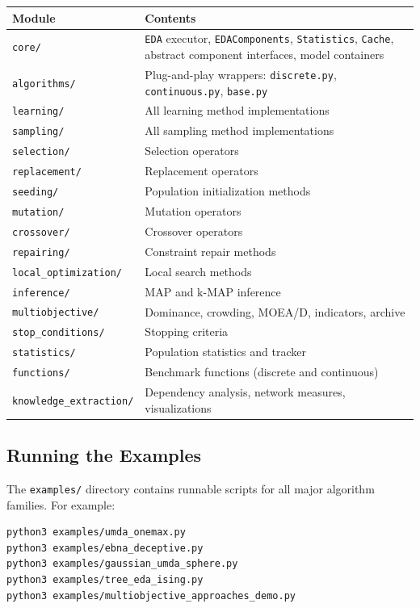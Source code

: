 \documentclass[a4paper,11pt]{article}
\begin{document}
\begin{center}
\begin{tabular}{lp{9cm}}
\toprule
\textbf{Module} & \textbf{Contents} \\
\midrule
\texttt{core/} & \texttt{EDA} executor, \texttt{EDAComponents}, \texttt{Statistics}, \texttt{Cache}, abstract component interfaces, model containers \\
\texttt{algorithms/} & Plug-and-play wrappers: \texttt{discrete.py}, \texttt{continuous.py}, \texttt{base.py} \\
\texttt{learning/} & All learning method implementations \\
\texttt{sampling/} & All sampling method implementations \\
\texttt{selection/} & Selection operators \\
\texttt{replacement/} & Replacement operators \\
\texttt{seeding/} & Population initialization methods \\
\texttt{mutation/} & Mutation operators \\
\texttt{crossover/} & Crossover operators \\
\texttt{repairing/} & Constraint repair methods \\
\texttt{local\_optimization/} & Local search methods \\
\texttt{inference/} & MAP and k-MAP inference \\
\texttt{multiobjective/} & Dominance, crowding, MOEA/D, indicators, archive \\
\texttt{stop\_conditions/} & Stopping criteria \\
\texttt{statistics/} & Population statistics and tracker \\
\texttt{functions/} & Benchmark functions (discrete and continuous) \\
\texttt{knowledge\_extraction/} & Dependency analysis, network measures, visualizations \\
\bottomrule
\end{tabular}
\end{center}

\subsection{Running the Examples}

The \texttt{examples/} directory contains runnable scripts for all major algorithm families.  For example:

\begin{lstlisting}[language=bash]
%cd packages/pateda/examples
python3 examples/umda_onemax.py
python3 examples/ebna_deceptive.py
python3 examples/gaussian_umda_sphere.py
python3 examples/tree_eda_ising.py
python3 examples/multiobjective_approaches_demo.py
\end{lstlisting}
\end{document}
